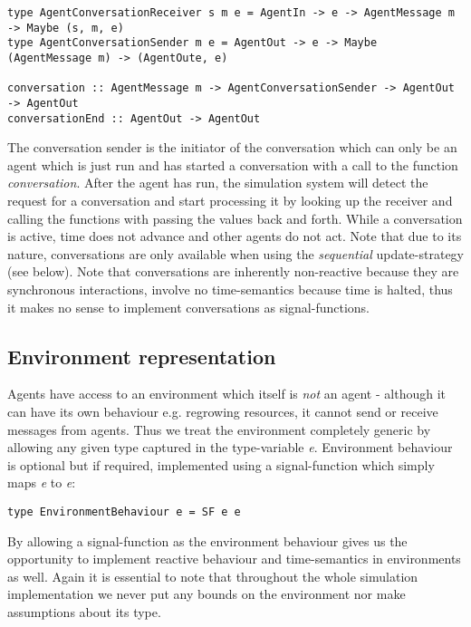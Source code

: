 \begin{verbatim}
type AgentConversationReceiver s m e = AgentIn -> e -> AgentMessage m -> Maybe (s, m, e)
type AgentConversationSender m e = AgentOut -> e -> Maybe (AgentMessage m) -> (AgentOute, e)
                                        
conversation :: AgentMessage m -> AgentConversationSender -> AgentOut -> AgentOut
conversationEnd :: AgentOut -> AgentOut 
\end{verbatim}

The conversation sender is the initiator of the conversation which can only be an agent which is just run and has started a conversation with a call to the function \textit{conversation}. After the agent has run, the simulation system will detect the request for a conversation and start processing it by looking up the receiver and calling the functions with passing the values back and forth. While a conversation is active, time does not advance and other agents do not act. Note that due to its nature, conversations are only available when using the \textit{sequential} update-strategy (see below). Note that conversations are inherently non-reactive because they are synchronous interactions, involve no time-semantics because time is halted, thus it makes no sense to implement conversations as signal-functions.

\subsection{Environment representation}
\label{sub:env_rep}

Agents have access to an environment which itself is \textit{not} an agent - although it can have its own behaviour e.g. regrowing resources, it cannot send or receive messages from agents. Thus we treat the environment completely generic by allowing any given type captured in the type-variable \textit{e}. Environment behaviour is optional but if required, implemented using a signal-function which simply maps \textit{e} to \textit{e}:

\begin{verbatim}
type EnvironmentBehaviour e = SF e e
\end{verbatim}

By allowing a signal-function as the environment behaviour gives us the opportunity to implement reactive behaviour and time-semantics in environments as well. Again it is essential to note that throughout the whole simulation implementation we never put any bounds on the environment nor make assumptions about its type.

